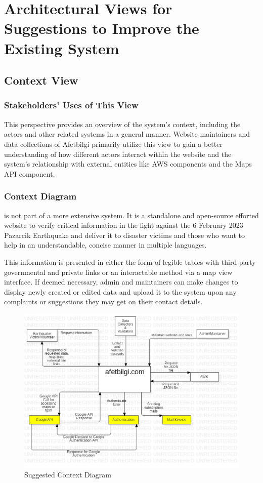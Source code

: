 \section{Architectural Views for Suggestions to Improve the Existing System}

\subsection{Context View}

\subsubsection{Stakeholders' Uses of This View}

This perspective provides an overview of the system's context, including the actors and other related systems in a general manner. Website maintainers and data collections of Afetbilgi primarily utilize this view to gain a better understanding of how different actors interact within the website and the system's relationship with external entities like AWS components and the Maps API component.

\subsubsection{Context Diagram}

\afetbilgi is not part of a more extensive system. It is a standalone and open-source efforted website to verify critical information in the fight against the 6 February 2023 Pazarcik Earthquake and deliver it to disaster victims and those who want to help in an understandable, concise manner in multiple languages.

This information is presented in either the form of legible tables with third-party governmental and private links or an interactable method via a map view interface. If deemed necessary, admin and maintainers can make changes to display newly created or edited data and upload it to the system upon any complaints or suggestions they may get on their contact details.

\begin{figure}[H]
  \centering
  \includegraphics[width=\linewidth]{img/context-diagram-s5.jpg}
  \caption{Suggested Context Diagram}
\end{figure}

